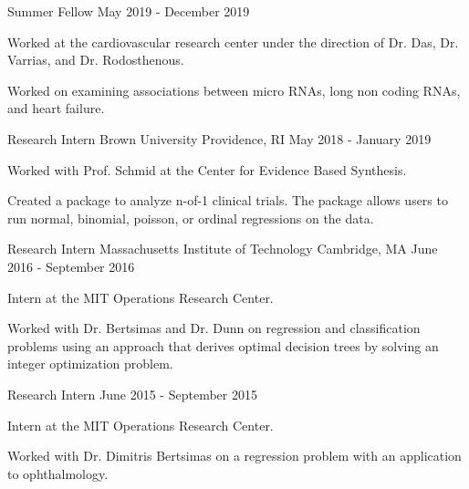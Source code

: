 \begin{cventries}
  \cventry
    {Summer Fellow} %
    {} %
    {} %
    {May 2019 - December 2019} %
    {
      \begin{cvitems} %
        \item {Worked at the cardiovascular research center under the direction of Dr. Das, Dr. Varrias, and Dr. Rodosthenous.} 
        \item {Worked on examining associations between micro RNAs, long non
        coding RNAs, and heart failure.}
      \end{cvitems}
    }

\vspace{-1mm}
  \cventry
    {Research Intern} %
    {Brown University} %
    {Providence, RI} %
    {May 2018 - January 2019} %
    {
      \begin{cvitems} %
        \item {Worked with Prof. Schmid at the Center for Evidence Based Synthesis.} 
        \item {Created a package to analyze n-of-1 clinical trials. The package
        allows users to run normal, binomial, poisson, or ordinal regressions
        on the data.}
      \end{cvitems}
    }

  \cventry
    {Research Intern} %
    {Massachusetts Institute of Technology} %
    {Cambridge, MA} %
    {June 2016 - September 2016} %
    {
      \begin{cvitems} %
        \item {Intern at the MIT Operations Research Center.}
        \item {Worked with Dr. Bertsimas and Dr. Dunn on regression and
        classification problems using an approach that derives optimal decision
        trees by solving an integer optimization problem.}
      \end{cvitems}
    }

  \cventry
    {Research Intern} %
    {} %
    {} %
    {June 2015 - September 2015} %
    {
      \begin{cvitems} %
        \item {Intern at the MIT Operations Research Center.}
        \item {Worked with Dr. Dimitris Bertsimas on a regression problem
        with an application to ophthalmology.}
      \end{cvitems}
    }

\end{cventries}
